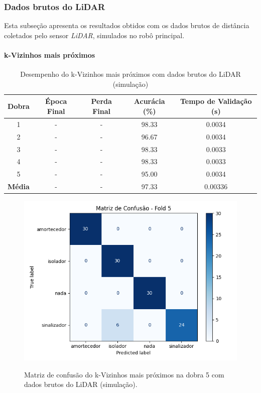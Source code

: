 \subsubsection{Dados brutos do LiDAR}

Esta subseção apresenta os resultados obtidos com os dados brutos de distância coletados pelo sensor \textit{LiDAR}, simulados no robô principal.   

\paragraph{k-Vizinhos mais próximos}

\begin{table}[H]
\centering
\caption{Desempenho do k-Vizinhos mais próximos com dados brutos do LiDAR (simulação)}
\label{tab:knn_lidar_bruto}
\begin{tabular}{ccccc}
\hline
\textbf{Dobra} & \textbf{Época Final} & \textbf{Perda Final} & \textbf{Acurácia (\%)} & \textbf{Tempo de Validação (s)} \\
\hline
1 & - & -      & 98.33 & 0.0034 \\
2 & - & -      & 96.67 & 0.0034 \\
3 & - & -      & 98.33 & 0.0033 \\
4 & - & -      & 98.33 & 0.0033 \\
5 & - & -      & 95.00 & 0.0034 \\
\hline
\textbf{Média} & - & - & 97.33 & 0.00336 \\
\hline
\end{tabular}
\fonte{}
\end{table}

\begin{figure}[H]
\caption{Matriz de confusão do k-Vizinhos mais próximos na dobra 5 com dados brutos do LiDAR (simulação).}
\includegraphics[width=0.7\linewidth]{figuras/Resultados/simu_principal_Teste2_knn.png}
\fonte{}
\label{fig:matriz_confusao_knn_lidar_bruto}
\end{figure}

